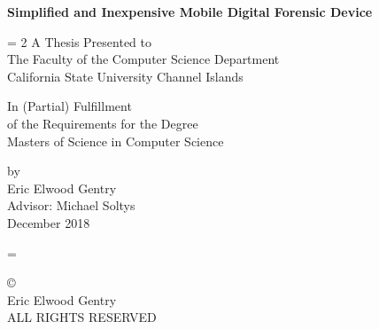 \documentclass[12pt]{article}
\begin{document}
\begin{titlepage}
\begin{center}
{\Large \bfseries Simplified and Inexpensive Mobile Digital Forensic Device \par}

\vspace{2 cm}
\baselineskip = 2\baselineskip
A Thesis Presented to \\
The Faculty of the Computer Science Department\\
California State University Channel Islands

\vspace{1 cm}

In (Partial) Fulfillment\\
of the Requirements for the Degree\\
Masters of Science in Computer Science\\

\vspace{1 cm }

\vfill

by \\
Eric Elwood Gentry\\
Advisor: Michael Soltys\\
December 2018
\end{center}
\end{titlepage}
\baselineskip = \baselineskip

\newpage
\null
\vfill
\begin{flushleft}
\copyright{}\\
Eric Elwood Gentry\\
ALL RIGHTS RESERVED
\end{flushleft}
\newpage
\end{document}
